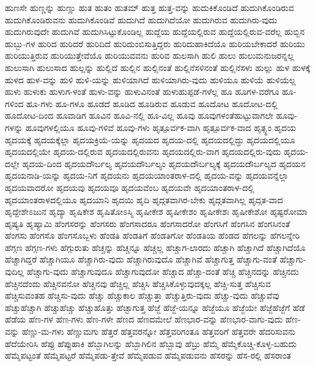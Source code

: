 {ಹುಣಸೇ
ಹುಣ್ಣನ್ನು
ಹುಣ್ಣು
ಹುತ
ಹುತಂ
ಹುತಮ್
ಹುತ್ತ
ಹುತ್ತ-ವನ್ನು
ಹುದುಕಿಕೊಂಡಿದೆ
ಹುದುಗಿಕೊಂಡಿರುವ
ಹುದುಗಿಕೊಂಡಿರುವನು
ಹುದುಗಿಕೊಂಡಿವೆ
ಹುದುಗಿದೆ
ಹುದುಗಿದೆಯೋ
ಹುದುಗಿರುವ
ಹುದುಗಿರು-ವುದು
ಹುದುಗಿರುವುದೇ
ಹುದುಗಿವೆ
ಹುದುಗಿಸಿಟ್ಟುಕೊಂಡಿಲ್ಲ
ಹುದ್ದೆಯ
ಹುದ್ದೆಯಲ್ಲಿರುವ
ಹುದ್ದೆಯಲ್ಲಿರುವ-ವರೆಲ್ಲ
ಹುಬ್ಬಿನ
ಹುಬ್ಬು-ಗಳ
ಹುರಿದ
ಹುರಿದರೆ
ಹುರಿದಿದೆ
ಹುರಿದುಂಬಿಸುತ್ತಿದ್ದರು
ಹುರಿದುಹಾಕಿದೆಯೊ
ಹುರಿಯಬೇಕಾದರೆ
ಹುರಿಯು
ಹುರಿಯುತ್ತಿರುವ
ಹುರಿಯುತ್ತೇವೆಯೊ
ಹುರಿಯುವವನು
ಹುರಿವ
ಹುಲಸಾಗಿ
ಹುಲಿ
ಹುಲು
ಹುಲುಮನುಜರನ್ನಲ್ಲ
ಹುಲುಸಾಗಿ
ಹುಲುಸಾದ
ಹುಲ್ಲನ್ನು
ಹುಲ್ಲಿದೆ
ಹುಲ್ಲಿನ
ಹುಲ್ಲಿನಂತೆ
ಹುಲ್ಲಿನೆಸಳಿನಂತೆ
ಹುಲ್ಲಿನೆಸಳು
ಹುಲ್ಲು
ಹುಳ
ಹುಳಕ್ಕೆ
ಹುಳದ
ಹುಳ-ವನ್ನು
ಹುಳಿ
ಹುಳಿ-ಯನ್ನು
ಹುಳಿಯಾಗಿದೆ
ಹುಳಿಯಾಗಿರು-ವುದು
ಹುಳಿಯೂ
ಹುಳಿಯೆ
ಹುಳಿಯೆಲ್ಲ
ಹುಳು
ಹುಳುಕು
ಹುಳುಗ-ಳಂತೆ
ಹುಳು-ವನ್ನು
ಹುಳುವಿನಂತೆ
ಹುಳುಹುಪ್ಪಡೆ-ಗಳೆಲ್ಲ
ಹೂ
ಹೂಗಳ-ವರೆಗೂ
ಹೂ-ಗಳಿಂದ
ಹೂ-ಗಳು
ಹೂ-ಗಳೂ
ಹೂಡದೆ
ಹೂಡಿದ
ಹೂಡಿರುವ
ಹೂಡುವ
ಹೂದೋಟ
ಹೂದೋಟ-ದಲ್ಲಿ
ಹೂದೋಟ-ದಿಂದ
ಹೂವಾಡಿಗ
ಹೂವಿನ
ಹೂವಿ-ನಲ್ಲಿ
ಹೂ-ವಿಲ್ಲ
ಹೂವು
ಹೂವುಗಳಂತೆಹುಟ್ಟುವಾಗಲೇ
ಹೂವು-ಗಳನ್ನು
ಹೂವುಗಳಲ್ಲಿಯೂ
ಹೂವು-ಗಳಿವೆ
ಹೂವು-ಗಳು
ಹೃತ್ಪೂರ್ವಕ-ವಾಗಿ
ಹೃತ್ಪೂರ್ವಕ-ವಾದ
ಹೃತ್ಸ್ಥಂ
ಹೃದಯ
ಹೃದಯಕ್ಕೆ
ಹೃದಯಕ್ಕೆಲ್ಲಾ
ಹೃದಯಕ್ರಿಯೆ-ಯನ್ನು
ಹೃದಯದ
ಹೃದಯ-ದಲ್ಲಿ
ಹೃದಯದಲ್ಲಿದ್ದು
ಹೃದಯದಲ್ಲಿಯೂ
ಹೃದಯದಲ್ಲಿಯೇ
ಹೃದಯ-ದಲ್ಲಿರುವ
ಹೃದಯದಲ್ಲಿರುವನು
ಹೃದಯದಲ್ಲಿರು-ವಾಗ
ಹೃದಯದಲ್ಲಿರು-ವುದು
ಹೃದಯ-ದಲ್ಲೇ
ಹೃದಯ-ದಿಂದ
ಹೃದಯದೌರ್ಬಲ್ಯ
ಹೃದಯದೌರ್ಬಲ್ಯಂ
ಹೃದಯದೌರ್ಬಲ್ಯಕ್ಕೆ
ಹೃದಯದೌರ್ಬಲ್ಯದ
ಹೃದಯನ
ಹೃದಯನಾಡಿ-ಯನ್ನು
ಹೃದಯ-ನಿಗೆ
ಹೃದಯನು
ಹೃದಯಯಾಂತರಾಳ-ದಲ್ಲಿ
ಹೃದಯ-ವನ್ನು
ಹೃದಯವನ್ನೆಲ್ಲಾ
ಹೃದಯವಾದರೋ
ಹೃದಯವು
ಹೃದಯವೂ
ಹೃದಯವೆಂಬ
ಹೃದಯವೇ
ಹೃದಯಾಂತರಾಳ-ದಲ್ಲಿ
ಹೃದಯಾಂತರಾಳದಲ್ಲಿಯೂ
ಹೃದಯಾನಿ
ಹೃದಯಿ
ಹೃದಿ
ಹೃದ್ಗತವಾಗಿರ-ಬೇಕು
ಹೃದ್ಗತವಾಗಿಲ್ಲ
ಹೃದ್ಗತ-ವಾದ
ಹೃದ್ದೇಶೇಽಜುನ
ಹೃದ್ಯಾ
ಹೃಷಿಕೇಶ
ಹೃಷಿತೋಽಸ್ಮಿ
ಹೃಷೀಕೇಶ
ಹೃಷೀಕೇಶಂ
ಹೃಷೀಕೇಶಃ
ಹೃಷೀಕೇಶೋ
ಹೃಷ್ಟರೋಮಾ
ಹೃಷ್ಯತಿ
ಹೃಷ್ಯಾಮಿ
ಹೆಂಗಸರನ್ನು
ಹೆಂಗಸರು
ಹೆಂಗಸಾದರೂ
ಹೆಂಗಸಾದರೋ
ಹೆಂಗಸಿಗೆ
ಹೆಂಗಸಿನ
ಹೆಂಗಸಿನಂತೆ
ಹೆಂಗಸು
ಹೆಂಗಸೊ
ಹೆಂಗಸೊಬ್ಬಳು
ಹೆಂಡತಿ
ಹೆಂಡತಿಗೆ
ಹೆಂಡತಿಗೋ
ಹೆಂಡತಿಯ
ಹೆಂಡದ
ಹೆಗಲನ್ನು
ಹೆಗಲನ್ನೇರಿ
ಹೆಗ್ಗಣ
ಹೆಗ್ಗಣ-ಗಳು
ಹೆಗ್ಗುರುತು
ಹೆಚ್ಚನ್ನು
ಹೆಚ್ಚನ್ನೂ
ಹೆಚ್ಚಲ್ಲ
ಹೆಚ್ಚಾಗ-ಲಾರದು
ಹೆಚ್ಚಾಗಿ
ಹೆಚ್ಚಾಗಿದೆ
ಹೆಚ್ಚಾಗಿದೆಯೊ
ಹೆಚ್ಚಾಗಿದ್ದರೆ
ಹೆಚ್ಚಾಗಿಯೂ
ಹೆಚ್ಚಾಗಿರು-ವುದು
ಹೆಚ್ಚಾಗಿರುವುದೊ
ಹೆಚ್ಚಾಗಿವೆ
ಹೆಚ್ಚಾಗುತ್ತ
ಹೆಚ್ಚಾಗು-ವಂತೆ
ಹೆಚ್ಚಾಗು-ವುದಿಲ್ಲ
ಹೆಚ್ಚಾಗು-ವುದು
ಹೆಚ್ಚಾಗುವುದೂ
ಹೆಚ್ಚಾಗುವುದೋ
ಹೆಚ್ಚಾದ
ಹೆಚ್ಚಾ-ದಂತೆ
ಹೆಚ್ಚಿ
ಹೆಚ್ಚಿನದನ್ನು
ಹೆಚ್ಚಿನದು
ಹೆಚ್ಚಿನದೆಂದು
ಹೆಚ್ಚಿನವನೋ
ಹೆಚ್ಚಿನವು
ಹೆಚ್ಚಿಲ್ಲ
ಹೆಚ್ಚಿಸಿ
ಹೆಚ್ಚಿಸಿಕೊಳ್ಳುವುದಕ್ಕಲ್ಲ
ಹೆಚ್ಚಿ-ಸುತ್ತ
ಹೆಚ್ಚಿಸುವ
ಹೆಚ್ಚಿಸುವಂತಹ
ಹೆಚ್ಚಿಸು-ವುದು
ಹೆಚ್ಚು
ಹೆಚ್ಚುಕಾಲ
ಹೆಚ್ಚುತ್ತಾ
ಹೆಚ್ಚುತ್ತಿರು-ವುದು
ಹೆಚ್ಚು-ವುದು
ಹೆಚ್ಚುವೆವು
ಹೆಚ್ಚುಹೆಚ್ಚಾಗಿ
ಹೆಚ್ಚುಹೆಚ್ಚು
ಹೆಚ್ಚುಹೊತ್ತು
ಹೆಚ್ಟಾಗುತ್ತ
ಹೆಜ್ಜೆ
ಹೆಜ್ಜೆ-ಯನ್ನೂ
ಹೆಜ್ಜೆಯೂ
ಹೆಜ್ಜೆಯೇ
ಹೆಜ್ಜೆಹೆಜ್ಜೆಗೆ
ಹೆಡೆ
ಹೆಡೆಯ
ಹೆಣ-ಗಳ
ಹೆಣ-ಗಳು
ಹೆಣ-ಗಳೇ
ಹೆಣದ
ಹೆಣದಮೇಲೆ
ಹೆಣಭಾರ-ವನ್ನು
ಹೆಣಭಾರ-ವಾಗು-ವುದು
ಹೆಣ-ವನ್ನು
ಹೆಣ್ಣು-ಮ-ಗಳು
ಹೆಣ್ಣುಮಗು
ಹೆತ್ತರೆ
ಹೆತ್ತವರನ್ನೋ
ಹೆತ್ತವರಿಗಂತೂ
ಹೆತ್ತವರಿಗೆ
ಹೆತ್ತವರೇ
ಹೆದರಿಸುವನು
ಹೆದೆಯೇರಿಸಿ
ಹೆಪ್ಪು
ಹೆಪ್ಪುಹಾಕಿ
ಹೆಬ್ಬಾಗಿಲನ್ನು
ಹೆಬ್ಬಾಗಿಲಿನ
ಹೆಬ್ಬಾವು
ಹೆಬ್ರು
ಹೆಮ್ಮೆ
ಹೆಮ್ಮೆಕೊಚ್ಚಿ-ಕೊಳ್ಳ-ಬಹುದು
ಹೆಮ್ಮೆಪಟ್ಟಂತೆ
ಹೆಮ್ಮೆಪಟ್ಟರೆ
ಹೆಮ್ಮೆಪಡು-ತ್ತೇವೆ
ಹೆಮ್ಮೆಪಡುವ
ಹೆಮ್ಮೆಪಡುವನು
ಹೆಸರನ್ನು
ಹೆಸ-ರಲ್ಲಿ
ಹೆಸರಾಂತ
}
